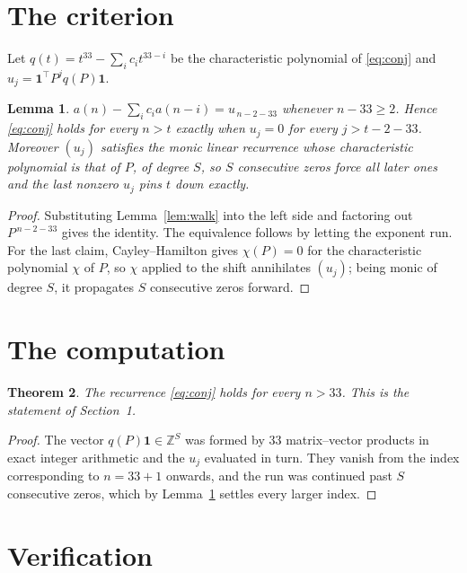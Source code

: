 \documentclass[11pt,a4paper]{article}
\theoremstyle{plain}
\newtheorem{theorem}{Theorem}
\newtheorem{lemma}[theorem]{Lemma}
\theoremstyle{definition}
\begin{document}
\section{The criterion}

Let $q(t)=t^{33}-\sum_i c_i t^{33-i}$ be the characteristic polynomial of
\eqref{eq:conj} and $u_j=\mathbf{1}^{\!\top}P^{j}q(P)\mathbf{1}$.

\begin{lemma}\label{lem:crit}
$a(n)-\sum_i c_i a(n-i)=u_{\,n-2-33}$ whenever $n-33\ge2$. Hence
\eqref{eq:conj} holds for every $n>t$ exactly when $u_j=0$ for every
$j>t-2-33$. Moreover $(u_j)$ satisfies the monic linear recurrence whose
characteristic polynomial is that of $P$, of degree $S$, so $S$ consecutive zeros force all
later ones and the last nonzero $u_j$ pins $t$ down exactly.
\end{lemma}

\begin{proof}
Substituting Lemma~\ref{lem:walk} into the left side and factoring out
$P^{\,n-2-33}$ gives the identity. The equivalence follows by letting the exponent
run. For the last claim, Cayley--Hamilton gives $\chi(P)=0$ for the characteristic
polynomial $\chi$ of $P$, so $\chi$ applied to the shift annihilates $(u_j)$; being monic of
degree $S$, it propagates $S$ consecutive zeros forward.
\end{proof}

\section{The computation}

\begin{theorem}
The recurrence \eqref{eq:conj} holds for every $n>33$. This is the statement of
Section~1.
\end{theorem}

\begin{proof}
The vector $q(P)\mathbf{1}\in\mathbb{Z}^{S}$ was formed by $33$ matrix--vector
products in exact integer arithmetic and the $u_j$ evaluated in turn. They vanish from the
index corresponding to $n=33+1$ onwards, and the run was continued past $S$ consecutive
zeros, which by Lemma~\ref{lem:crit} settles every larger index.
\end{proof}

\section{Verification}
\end{document}
